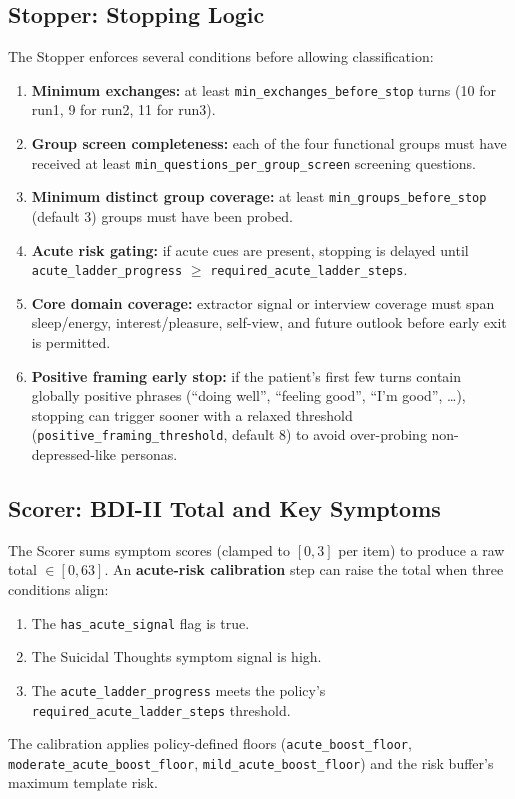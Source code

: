 \documentclass[]{ceurart}
\begin{document}
\subsection{Stopper: Stopping Logic}\label{sec:stopper}

The Stopper enforces several conditions before allowing classification:

\begin{enumerate}
\item \textbf{Minimum exchanges:} at least \texttt{min\_exchanges\_before\_stop} turns (10 for run1, 9 for run2, 11 for run3).
\item \textbf{Group screen completeness:} each of the four functional groups must have received at least \texttt{min\_questions\_per\_group\_screen} screening questions.
\item \textbf{Minimum distinct group coverage:} at least \texttt{min\_groups\_before\_stop} (default 3) groups must have been probed.
\item \textbf{Acute risk gating:} if acute cues are present, stopping is delayed until \texttt{acute\_ladder\_progress} $\geq$ \texttt{required\_acute\_ladder\_steps}.
\item \textbf{Core domain coverage:} extractor signal or interview coverage must span sleep/energy, interest/pleasure, self-view, and future outlook before early exit is permitted.
\item \textbf{Positive framing early stop:} if the patient's first few turns contain globally positive phrases (``doing well'', ``feeling good'', ``I'm good'', \ldots), stopping can trigger sooner with a relaxed threshold (\texttt{positive\_framing\_threshold}, default 8) to avoid over-probing non-depressed-like personas.
\end{enumerate}


\subsection{Scorer: BDI-II Total and Key Symptoms}\label{sec:scorer}

The Scorer sums symptom scores (clamped to $[0, 3]$ per item) to produce a raw total $\in [0, 63]$.
An \textbf{acute-risk calibration} step can raise the total when three conditions align:
\begin{enumerate}
\item The \texttt{has\_acute\_signal} flag is true.
\item The Suicidal Thoughts symptom signal is high.
\item The \texttt{acute\_ladder\_progress} meets the policy's \texttt{required\_acute\_ladder\_steps} threshold.
\end{enumerate}
The calibration applies policy-defined floors (\texttt{acute\_boost\_floor}, \texttt{moderate\_acute\_boost\_floor}, \texttt{mild\_acute\_boost\_floor}) and the risk buffer's maximum template risk.
\end{document}

